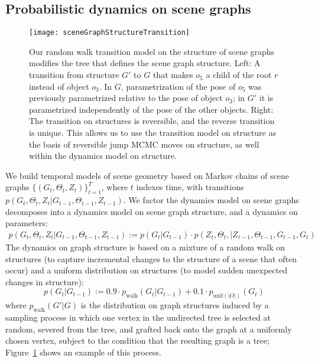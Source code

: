 \subsection{Probabilistic dynamics on scene graphs} \label{section:dynamics}
\begin{figure}[t]
  \centering
  \texttt{[image: sceneGraphStructureTransition]}
  \caption{
    Our random walk transition model on the structure of scene graphs modifies the tree that defines the scene graph structure.
    Left: A transition from structure $G'$ to $G$ that makes $o_5$ a child of the root $r$ instead of object $o_3$.
    In $G$, parametrization of the pose of $o_5$ was previously parametrized relative to the pose of object $o_3$; in $G'$ it is parametrized independently of the pose of the other objects.
    Right: The transition on structures is reversible, and the reverse transition is unique.
    This allows us to use the transition model on structure as the basis of reversible jump MCMC moves on structure, as well within the dynamics model on structure.
  }
  \label{fig:sceneGraphStructureTransition}
\end{figure}
We build temporal models of scene geometry based on Markov chains of scene graphs $\{(G_t, \Theta_t, Z_t)\}_{t=1}^T$, where $t$ indexes time, with transitions $p(G_t, \Theta_t, Z_t | G_{t-1}, \Theta_{t-1}, Z_{t-1})$.
We factor the dynamics model on scene graphs decomposes into a dynamics model on scene graph structure, and a dynamics on parameters:
\begin{align}
    p(G_t, \Theta_t, Z_t | G_{t-1}, \Theta_{t-1}, Z_{t-1}) :=
        p(G_t | G_{t-1})
        \cdot p(Z_t, \Theta_t, | Z_{t-1}, \Theta_{t-1}, G_{t-1}, G_t)
\end{align}
The dynamics on graph structure is based on a mixture of a random walk on structures (to capture incremental changes to the structure of a scene that often occur) and a uniform distribution on structures (to model sudden unexpected changes in structure):
\begin{equation}
    p(G_t | G_{t-1}) :=  0.9 \cdot p_{\mathrm{walk}}(G_t | G_{t-1}) + 0.1 \cdot p_{\mathrm{unif}(|O|)}(G_t)
\end{equation}
where $p_{\mathrm{walk}}(G' | G)$ is the distribution on graph structures induced by a sampling process in which one vertex in the undirected tree is selected at random, severed from the tree, and grafted back onto the graph at a uniformly chosen vertex, subject to the condition that the resulting graph is a tree;
Figure~\ref{fig:sceneGraphStructureTransition} shows an example of this process.
